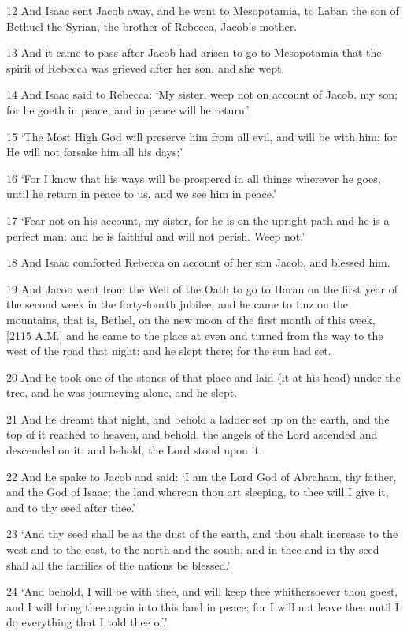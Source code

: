 \par 12 And Isaac sent Jacob away, and he went to Mesopotamia, to Laban the son of Bethuel the Syrian, the brother of Rebecca, Jacob's mother.
\par 13 And it came to pass after Jacob had arisen to go to Mesopotamia that the spirit of Rebecca was grieved after her son, and she wept.
\par 14 And Isaac said to Rebecca: ‘My sister, weep not on account of Jacob, my son; for he goeth in peace, and in peace will he return.’
\par 15 ‘The Most High God will preserve him from all evil, and will be with him; for He will not forsake him all his days;’
\par 16 ‘For I know that his ways will be prospered in all things wherever he goes, until he return in peace to us, and we see him in peace.’
\par 17 ‘Fear not on his account, my sister, for he is on the upright path and he is a perfect man: and he is faithful and will not perish. Weep not.’
\par 18 And Isaac comforted Rebecca on account of her son Jacob, and blessed him.
\par 19 And Jacob went from the Well of the Oath to go to Haran on the first year of the second week in the forty-fourth jubilee, and he came to Luz on the mountains, that is, Bethel, on the new moon of the first month of this week, [2115 A.M.] and he came to the place at even and turned from the way to the west of the road that night: and he slept there; for the sun had set.
\par 20 And he took one of the stones of that place and laid (it at his head) under the tree, and he was journeying alone, and he slept.
\par 21 And he dreamt that night, and behold a ladder set up on the earth, and the top of it reached to heaven, and behold, the angels of the Lord ascended and descended on it: and behold, the Lord stood upon it.
\par 22 And he spake to Jacob and said: ‘I am the Lord God of Abraham, thy father, and the God of Isaac; the land whereon thou art sleeping, to thee will I give it, and to thy seed after thee.’
\par 23 ‘And thy seed shall be as the dust of the earth, and thou shalt increase to the west and to the east, to the north and the south, and in thee and in thy seed shall all the families of the nations be blessed.’
\par 24 ‘And behold, I will be with thee, and will keep thee whithersoever thou goest, and I will bring thee again into this land in peace; for I will not leave thee until I do everything that I told thee of.’
